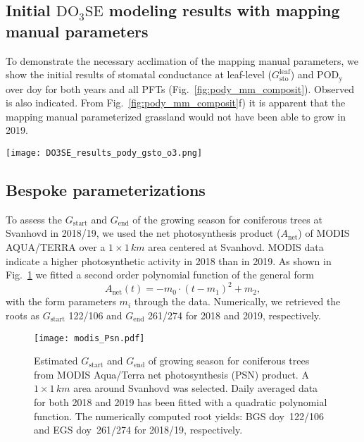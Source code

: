 \documentclass[bg, manuscript]{copernicus}
\begin{document}
\subsection{Initial $\mathrm{DO_3SE}$ modeling results with mapping manual parameters}
To demonstrate the necessary acclimation of the mapping manual parameters, we show the initial results of stomatal conductance at leaf-level ($G_\mathrm{sto}^\mathrm{leaf}$) and $\mathrm{POD_y}$ over \unit{doy} for both years and all PFTs (Fig.~\ref{fig:pody_mm_composit}). Observed \chem{[O_3]} is also indicated. From Fig.~\ref{fig:pody_mm_composit}f) it is apparent that the mapping manual parameterized grassland would not have been able to grow in 2019.

\begin{figure*}[t]
  \texttt{[image: DO3SE\_results\_pody\_gsto\_o3.png]}
  \caption{$\mathrm{DO_3SE}$ modeling results for mapping manual default parameterization. $\mathrm{POD_y}$ is shown over \unit{doy}, March--October. A flux threshold $y=1\,\unit{nmol\,m^{-2}\,s^{-1}}$ per projected leaf area (PLA) has been chosen. \chem{[O_3]} are plotted on the same axis and scales as $G_\text{sto}^\text{leaf}$ but in units of $\unit{ppb}$. (a, b) deciduous tree; (c, d) coniferous tree; (e, f) perennial grassland. From left to right: 2018, 2019.}
  \label{fig:pody_mm_composit}
\end{figure*}

\subsection{Bespoke parameterizations}

To assess the $G_\mathrm{start}$  and $G_\mathrm{end}$ of the growing season for coniferous trees at Svanhovd in 2018/19, we used the net photosynthesis product ($A_\mathrm{net}$) of MODIS AQUA/TERRA over a $1\times 1\,\unit{km}$ area centered at Svanhovd. MODIS data indicate a higher photosynthetic activity in 2018 than in 2019. As shown in Fig.~\ref{fig:modis_Psn} we fitted a second order polynomial function of the general form
%
\begin{equation}
A_\mathrm{net}(t) =  -m_0\cdot(t-m_1)^2+m_2,
\end{equation}
%
with the form parameters $m_i$ through the data. Numerically, we retrieved the roots as $G_\mathrm{start}$ 122/106 and $G_\mathrm{end}$ 261/274 for 2018 and 2019, respectively. 

\begin{figure}[th]
  \texttt{[image: modis\_Psn.pdf]}
  \caption{Estimated $G_\mathrm{start}$ and $G_\mathrm{end}$ of growing season for coniferous trees from MODIS Aqua/Terra net photosynthesis (PSN) product. A $1\times 1\,\unit{km}$ area around Svanhovd was selected. Daily averaged data for both 2018 and 2019 has been fitted with a quadratic polynomial function. The numerically computed root yields: BGS \unit{doy}~122/106 and EGS \unit{doy}~261/274 for 2018/19, respectively.}
  \label{fig:modis_Psn}
\end{figure}
\end{document}
